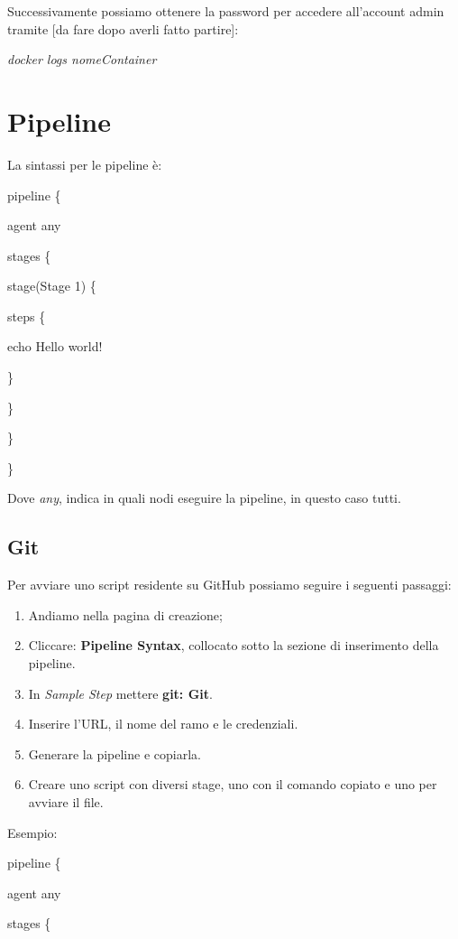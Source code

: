 Successivamente possiamo ottenere la password per accedere all'account
admin tramite {[}da fare dopo averli fatto partire{]}:

\emph{docker logs nomeContainer}

\section{Pipeline}\label{pipeline}

La sintassi per le pipeline è:

pipeline \{

agent any

stages \{

stage(\textquotesingle Stage 1\textquotesingle) \{

steps \{

echo \textquotesingle Hello world!\textquotesingle{}

\}

\}

\}

\}

Dove \emph{any}, indica in quali nodi eseguire la pipeline, in questo
caso tutti.

\subsection{Git}\label{git}

Per avviare uno script residente su GitHub possiamo seguire i seguenti
passaggi:

\begin{enumerate}
\def\labelenumi{\arabic{enumi}.}
\item
  Andiamo nella pagina di creazione;
\item
  Cliccare: \textbf{Pipeline Syntax}, collocato sotto la sezione di
  inserimento della pipeline.
\item
  In \emph{Sample Step} mettere \textbf{git: Git}.
\item
  Inserire l'URL, il nome del ramo e le credenziali.
\item
  Generare la pipeline e copiarla.
\item
  Creare uno script con diversi stage, uno con il comando copiato e uno
  per avviare il file.
\end{enumerate}

Esempio:

pipeline \{

agent any

stages \{

